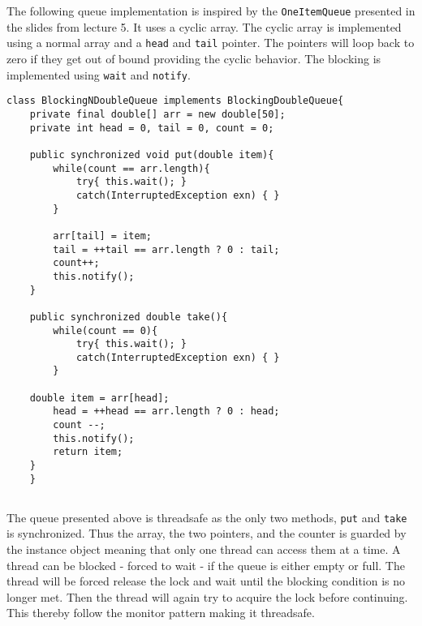 \documentclass{ituhandin}
\begin{document}
\chapter{} %
\section{}

The following queue implementation is inspired by the \texttt{OneItemQueue} presented in the slides from lecture 5. It uses a cyclic array. The cyclic array is implemented using a normal array and a \texttt{head} and \texttt{tail} pointer. The pointers will loop back to zero if they get out of bound providing the cyclic behavior. The blocking is implemented using \texttt{wait} and \texttt{notify}.

\begin{lstlisting}[caption= Implementation of the \texttt{BlockingNDoubleQueue} blocking fixed size queue]
class BlockingNDoubleQueue implements BlockingDoubleQueue{
    private final double[] arr = new double[50];
    private int head = 0, tail = 0, count = 0;

    public synchronized void put(double item){
        while(count == arr.length){
            try{ this.wait(); }
            catch(InterruptedException exn) { }
        }

        arr[tail] = item;
        tail = ++tail == arr.length ? 0 : tail;
        count++;
        this.notify();
    }

    public synchronized double take(){
        while(count == 0){
            try{ this.wait(); }
            catch(InterruptedException exn) { }
        }

    double item = arr[head];
        head = ++head == arr.length ? 0 : head;
        count --;
        this.notify();
        return item;
    }
    }
\end{lstlisting}

\section{}
The queue presented above is threadsafe as the only two methods, \texttt{put} and \texttt{take} is synchronized. Thus the array, the two pointers, and the counter is guarded by the instance object meaning that only one thread can access them at a time. A thread can be blocked - forced to wait - if the queue is either empty or full. The thread will be forced release the lock and wait until the blocking condition is no longer met. Then the thread will again try to acquire the lock before continuing. This thereby follow the monitor pattern making it threadsafe. 
\end{document}
